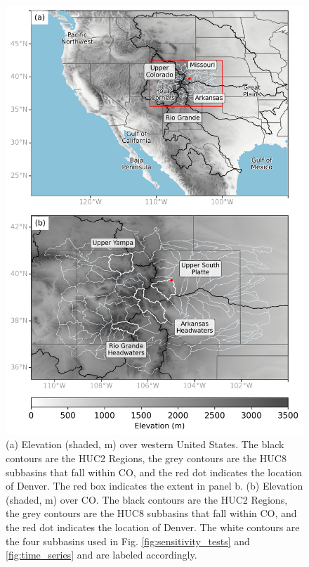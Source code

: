 \documentclass[draft]{agujournal2019}
\begin{document}
\begin{figure}
\noindent\includegraphics[width=\textwidth, height=\textheight, keepaspectratio]{fig1.png}
\caption{(a) Elevation (shaded, m) over western United States. The black contours are the HUC2 Regions, the grey contours are the HUC8 subbasins that fall within CO, and the red dot indicates the location of Denver. The red box indicates the extent in panel b. (b) Elevation (shaded, m) over CO. The black contours are the HUC2 Regions, the grey contours are the HUC8 subbasins that fall within CO, and the red dot indicates the location of Denver. The white contours are the four subbasins used in Fig. \ref{fig:sensitivity_tests} and \ref{fig:time_series} and are labeled accordingly. }
\label{fig:elevation}
\end{figure}
\end{document}
